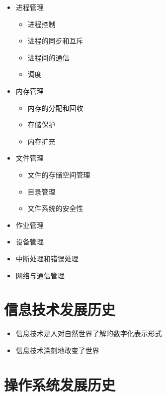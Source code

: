 \documentclass[a4paper,10pt,notitlepage]{article}
\begin{document}
\begin{itemize}
	
	\item 进程管理
	\begin{itemize}
		\item 进程控制
		\item 进程的同步和互斥
		\item 进程间的通信
		\item 调度
	\end{itemize}
	
	\item 内存管理
	\begin{itemize}
		\item 内存的分配和回收
		\item 存储保护
		\item 内存扩充
	\end{itemize}
	
	\item 文件管理
	\begin{itemize}
		\item 文件的存储空间管理
		\item 目录管理
		\item 文件系统的安全性
	\end{itemize}
	
	\item 作业管理
	\item 设备管理
	\item 中断处理和错误处理
	\item 网络与通信管理
	
\end{itemize}

\section{信息技术发展历史}

\begin{itemize}
	
	\item 信息技术是人对自然世界了解的数字化表示形式
	\item 信息技术深刻地改变了世界

\end{itemize}
	
\section{操作系统发展历史}
\end{document}
